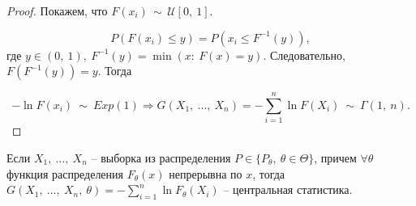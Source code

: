 \begin{proof}
Покажем, что $\displaystyle F( x_{i}) \, \sim \, \mathcal{U}[ 0,\ 1]$.


\begin{equation*}
P( F( x_{i}) \leqslant y) =P\left( x_{i} \leqslant F^{-1}( y)\right) ,
\end{equation*}
где $\displaystyle y\in ( 0,\ 1) ,\ F^{-1}( y) =\min( x:\ F( x) =y)$. Следовательно, $\displaystyle F\left( F^{-1}( y)\right) =y$. Тогда


\begin{equation*}
-\ln F( x_{i}) \ \sim \ Exp( 1) \Rightarrow G( X_{1} ,\ \dotsc ,\ X_{n}) =-\sum _{i=1}^{n}\ln F( X_{i}) \ \sim \ \Gamma ( 1,\ n) .
\end{equation*}
\end{proof}
\begin{corollary}
Если $\displaystyle X_{1} ,\ \dotsc ,\ X_{n}$ -- выборка из распределения $\displaystyle P\in \{P_{\theta } ,\ \theta \in \Theta \}$, причем $\displaystyle \forall \theta $ функция распределения $\displaystyle F_{\theta }( x)$ непрерывна по $\displaystyle x$, тогда $\displaystyle G( X_{1} ,\ \dotsc ,\ X_{n} ,\ \theta ) =-\sum _{i=1}^{n}\ln F_{\theta }( X_{i})$ -- центральная статистика.
\end{corollary}